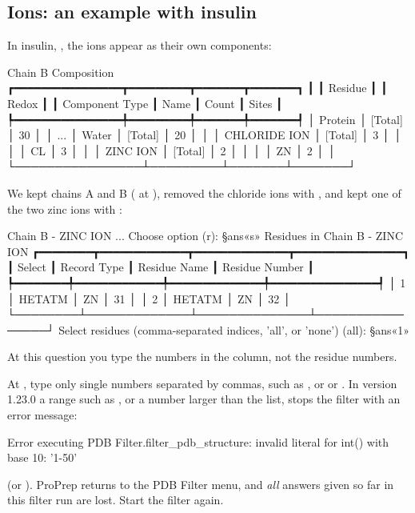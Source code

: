 \subsection{Ions: an example with insulin}

In insulin, , the ions appear as their own components:
\begin{screen}
Chain B Composition
┏━━━━━━━━━━━━━━━━┳━━━━━━━━━┳━━━━━━━┳━━━━━━━┓
┃                ┃ Residue ┃       ┃ Redox ┃
┃ Component Type ┃  Name   ┃ Count ┃ Sites ┃
┡━━━━━━━━━━━━━━━━╇━━━━━━━━━╇━━━━━━━╇━━━━━━━┩
│ Protein        │ [Total] │  30   │       │
...
│ Water          │ [Total] │  20   │       │
│ CHLORIDE ION   │ [Total] │   3   │       │
│                │   CL    │   3   │       │
│ ZINC ION       │ [Total] │   2   │       │
│                │   ZN    │   2   │       │
└────────────────┴─────────┴───────┴───────┘
\end{screen}
We kept chains A and B ( at ), removed the
chloride ions with , and kept one of the two zinc ions with :
\begin{screen}
Chain B - ZINC ION
...
Choose option (r): §ans«s»
             Residues in Chain B - ZINC ION
┏━━━━━━━━┳━━━━━━━━━━━━━┳━━━━━━━━━━━━━━┳━━━━━━━━━━━━━━━━┓
┃ Select ┃ Record Type ┃ Residue Name ┃ Residue Number ┃
┡━━━━━━━━╇━━━━━━━━━━━━━╇━━━━━━━━━━━━━━╇━━━━━━━━━━━━━━━━┩
│ 1      │ HETATM      │ ZN           │ 31             │
│ 2      │ HETATM      │ ZN           │ 32             │
└────────┴─────────────┴──────────────┴────────────────┘
Select residues (comma-separated indices, 'all', or 'none') (all): §ans«1»
\end{screen}
At this question you type the numbers in the  column, not the
residue numbers.

\begin{watchout}
At , type only single numbers separated by commas, such
as , or  or . In version 1.23.0 a range such
as , or a number larger than the list, stops the filter with an
error message:
\begin{screen}
Error executing PDB Filter.filter_pdb_structure: invalid literal for int()
with base 10: '1-50'
\end{screen}
(or ). ProPrep returns to the PDB Filter menu,
and \emph{all} answers given so far in this filter run are lost. Start the
filter again.
\end{watchout}


